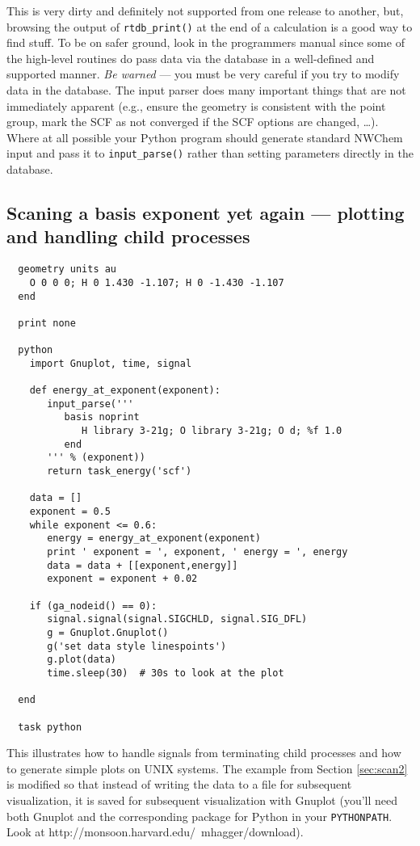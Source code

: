 This is very dirty and definitely not supported from one release to
another, but, browsing the output of \verb+rtdb_print()+ at the end of
a calculation is a good way to find stuff.  To be on safer ground,
look in the programmers manual since some of the high-level routines
do pass data via the database in a well-defined and supported manner.
{\em Be warned} --- you must be very careful if you try to modify data
in the database. The input parser does many important things that are
not immediately apparent (e.g., ensure the geometry is consistent with
the point group, mark the SCF as not converged if the SCF options are
changed, \ldots).  Where at all possible your Python program should
generate standard NWChem input and pass it to \verb+input_parse()+
rather than setting parameters directly in the database.

\subsection{Scaning a basis exponent yet again --- plotting and 
handling child processes}
\label{sec:sigchld}

\begin{verbatim}
  geometry units au
    O 0 0 0; H 0 1.430 -1.107; H 0 -1.430 -1.107
  end

  print none

  python
    import Gnuplot, time, signal

    def energy_at_exponent(exponent):
       input_parse('''
          basis noprint
             H library 3-21g; O library 3-21g; O d; %f 1.0
          end
       ''' % (exponent))
       return task_energy('scf')

    data = []
    exponent = 0.5
    while exponent <= 0.6:
       energy = energy_at_exponent(exponent)
       print ' exponent = ', exponent, ' energy = ', energy
       data = data + [[exponent,energy]]
       exponent = exponent + 0.02

    if (ga_nodeid() == 0):
       signal.signal(signal.SIGCHLD, signal.SIG_DFL)
       g = Gnuplot.Gnuplot()
       g('set data style linespoints')
       g.plot(data)
       time.sleep(30)  # 30s to look at the plot

  end

  task python
\end{verbatim}

This illustrates how to handle signals from terminating child
processes and how to generate simple plots on UNIX systems.  The
example from Section \ref{sec:scan2} is modified so that instead of
writing the data to a file for subsequent visualization, it is saved
for subsequent visualization with Gnuplot (you'll need both Gnuplot
and the corresponding package for Python in your \verb+PYTHONPATH+.
Look at http://monsoon.harvard.edu/~mhagger/download).

